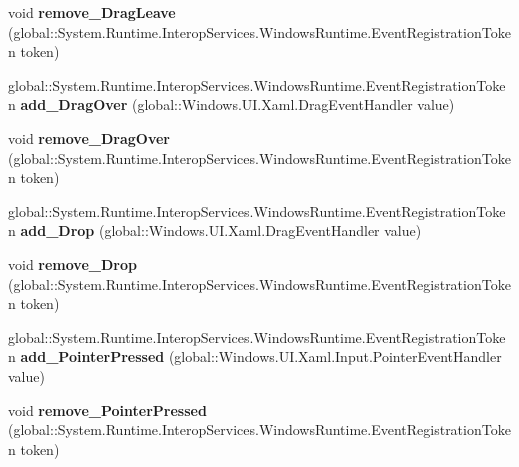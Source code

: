 \begin{DoxyCompactItemize}
void {\bfseries remove\+\_\+\+Drag\+Leave} (global\+::\+System.\+Runtime.\+Interop\+Services.\+Windows\+Runtime.\+Event\+Registration\+Token token)
\item 
\mbox{\label{interface_windows_1_1_u_i_1_1_xaml_1_1_i_u_i_element_a6deb1e61adbba0617ff0428e75ee83da}} 
global\+::\+System.\+Runtime.\+Interop\+Services.\+Windows\+Runtime.\+Event\+Registration\+Token {\bfseries add\+\_\+\+Drag\+Over} (global\+::\+Windows.\+U\+I.\+Xaml.\+Drag\+Event\+Handler value)
\item 
\mbox{\label{interface_windows_1_1_u_i_1_1_xaml_1_1_i_u_i_element_a3fe57bf41ebbf92eca2afbd6cf17c63f}} 
void {\bfseries remove\+\_\+\+Drag\+Over} (global\+::\+System.\+Runtime.\+Interop\+Services.\+Windows\+Runtime.\+Event\+Registration\+Token token)
\item 
\mbox{\label{interface_windows_1_1_u_i_1_1_xaml_1_1_i_u_i_element_a1aa925e3d35192dcae38b8299243b5f4}} 
global\+::\+System.\+Runtime.\+Interop\+Services.\+Windows\+Runtime.\+Event\+Registration\+Token {\bfseries add\+\_\+\+Drop} (global\+::\+Windows.\+U\+I.\+Xaml.\+Drag\+Event\+Handler value)
\item 
\mbox{\label{interface_windows_1_1_u_i_1_1_xaml_1_1_i_u_i_element_a8138853a5ec389ca042bd806a4488df2}} 
void {\bfseries remove\+\_\+\+Drop} (global\+::\+System.\+Runtime.\+Interop\+Services.\+Windows\+Runtime.\+Event\+Registration\+Token token)
\item 
\mbox{\label{interface_windows_1_1_u_i_1_1_xaml_1_1_i_u_i_element_ac6c56c4e4d441548d94d567610440f7a}} 
global\+::\+System.\+Runtime.\+Interop\+Services.\+Windows\+Runtime.\+Event\+Registration\+Token {\bfseries add\+\_\+\+Pointer\+Pressed} (global\+::\+Windows.\+U\+I.\+Xaml.\+Input.\+Pointer\+Event\+Handler value)
\item 
\mbox{\label{interface_windows_1_1_u_i_1_1_xaml_1_1_i_u_i_element_a11ea5ff510170be96baba63e50ef0d68}} 
void {\bfseries remove\+\_\+\+Pointer\+Pressed} (global\+::\+System.\+Runtime.\+Interop\+Services.\+Windows\+Runtime.\+Event\+Registration\+Token token)

\end{DoxyCompactItemize}
